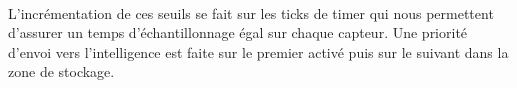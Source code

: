 
\paragraph{}
L'incrémentation de ces seuils se fait sur les ticks de timer qui nous
permettent d'assurer un temps d'échantillonnage égal sur chaque capteur.
Une priorité d'envoi vers l'intelligence est faite sur le premier activé puis
sur le suivant dans la zone de stockage. 
